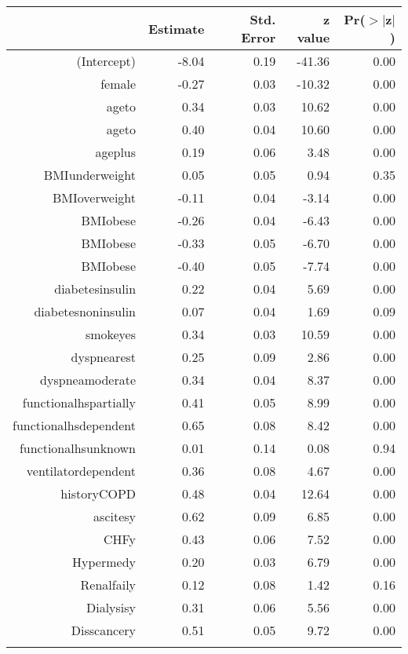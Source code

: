 \bigskip\bigskip
\centering
\begin{tabular}{rrrrr}
  \hline
 & Estimate & Std. Error & z value & Pr($>$$|$z$|$) \\ 
  \hline
(Intercept) & -8.04 & 0.19 & -41.36 & 0.00 \\ 
  female & -0.27 & 0.03 & -10.32 & 0.00 \\ 
  age\-65\-to\-74 & 0.34 & 0.03 & 10.62 & 0.00 \\ 
  age\-75\-to\-84 & 0.40 & 0.04 & 10.60 & 0.00 \\ 
  age\-85\-plus & 0.19 & 0.06 & 3.48 & 0.00 \\ 
  BMI\-underweight & 0.05 & 0.05 & 0.94 & 0.35 \\ 
  BMI\-overweight & -0.11 & 0.04 & -3.14 & 0.00 \\ 
  BMI\-obese\-1 & -0.26 & 0.04 & -6.43 & 0.00 \\ 
  BMI\-obese\-2 & -0.33 & 0.05 & -6.70 & 0.00 \\ 
  BMI\-obese\-3 & -0.40 & 0.05 & -7.74 & 0.00 \\ 
  diabetes\-insulin & 0.22 & 0.04 & 5.69 & 0.00 \\ 
  diabetes\-noninsulin & 0.07 & 0.04 & 1.69 & 0.09 \\ 
  smoke\-yes & 0.34 & 0.03 & 10.59 & 0.00 \\ 
  dyspnea\-rest & 0.25 & 0.09 & 2.86 & 0.00 \\ 
  dyspnea\-moderate & 0.34 & 0.04 & 8.37 & 0.00 \\ 
  functional\-hs\-partially & 0.41 & 0.05 & 8.99 & 0.00 \\ 
  functional\-hs\-dependent & 0.65 & 0.08 & 8.42 & 0.00 \\ 
  functional\-hs\-unknown & 0.01 & 0.14 & 0.08 & 0.94 \\ 
  ventilator\-dependent & 0.36 & 0.08 & 4.67 & 0.00 \\ 
  history\-COPD & 0.48 & 0.04 & 12.64 & 0.00 \\ 
  ascites\-y & 0.62 & 0.09 & 6.85 & 0.00 \\ 
  CHF\-y & 0.43 & 0.06 & 7.52 & 0.00 \\ 
  Hyper\-med\-y & 0.20 & 0.03 & 6.79 & 0.00 \\ 
  Renal\-fail\-y & 0.12 & 0.08 & 1.42 & 0.16 \\ 
  Dialysis\-y & 0.31 & 0.06 & 5.56 & 0.00 \\ 
  Diss\-cancer\-y & 0.51 & 0.05 & 9.72 & 0.00 \\ 
$$
\end{tabular}
